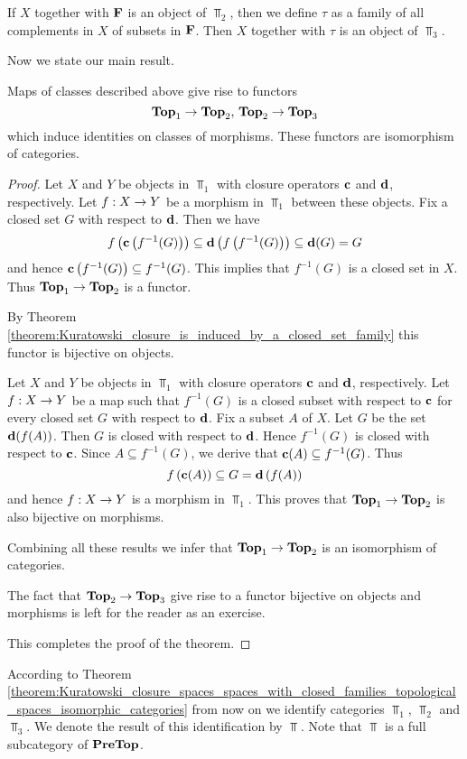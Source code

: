 If $X$ together with $\mathbf{F}$ is an object of $\Top_2$, then we define $\tau$ as a family of all complements in $X$ of subsets in $\mathbf{F}$. Then $X$ together with $\tau$ is an object of $\Top_3$.

Now we state our main result.

\begin{theorem}\label{theorem:Kuratowski_closure_spaces_spaces_with_closed_families_topological_spaces_isomorphic_categories}
	Maps of classes described above give rise to functors
	$$\mathbf{Top}_1 \rightarrow \mathbf{Top}_2,\,\mathbf{Top}_2 \rightarrow \mathbf{Top}_3$$
	which induce identities on classes of morphisms. These functors are isomorphism of categories.
\end{theorem}
\begin{proof}
	Let $X$ and $Y$ be objects in $\Top_1$ with closure operators $\mathbf{c}$ and $\mathbf{d}$, respectively. Let $f:X\rightarrow Y$ be a morphism in $\Top_1$ between these objects. Fix a closed set $G$ with respect to $\mathbf{d}$. Then we have
	$$f\left(\mathbf{c}\left(f^{-1}(G)\right)\right) \subseteq \mathbf{d}\left(f\left(f^{-1}(G)\right)\right) \subseteq \mathbf{d}(G) = G$$
	and hence $\mathbf{c}\left(f^{-1}(G)\right) \subseteq f^{-1}(G)$. This implies that $f^{-1}(G)$ is a closed set in $X$. Thus $\mathbf{Top}_1 \rightarrow \mathbf{Top}_2$ is a functor.

	By Theorem \ref{theorem:Kuratowski_closure_is_induced_by_a_closed_set_family} this functor is bijective on objects.

	Let $X$ and $Y$ be objects in $\Top_1$ with closure operators $\mathbf{c}$ and $\mathbf{d}$, respectively. Let $f:X\rightarrow Y$ be a map such that $f^{-1}(G)$ is a closed subset with respect to $\mathbf{c}$ for every closed set $G$ with respect to $\mathbf{d}$. Fix a subset $A$ of $X$. Let $G$ be the set $\mathbf{d}(f(A))$. Then $G$ is closed with respect to $\mathbf{d}$. Hence $f^{-1}(G)$ is closed with respect to $\mathbf{c}$. Since $A \subseteq f^{-1}(G)$, we derive that $\mathbf{c}(A) \subseteq f^{-1}(G)$. Thus
	$$f\left(\mathbf{c}(A)\right) \subseteq G = \mathbf{d}\left(f(A)\right)$$
	and hence $f:X\rightarrow Y$ is a morphism in $\Top_1$. This proves that $\mathbf{Top}_1 \rightarrow \mathbf{Top}_2$ is also bijective on morphisms.

	Combining all these results we infer that $\mathbf{Top}_1 \rightarrow \mathbf{Top}_2$ is an isomorphism of categories.

	The fact that $\mathbf{Top}_2 \rightarrow \mathbf{Top}_3$ give rise to a functor bijective on objects and morphisms is left for the reader as an exercise.

	This completes the proof of the theorem.
\end{proof}
\noindent
According to Theorem \ref{theorem:Kuratowski_closure_spaces_spaces_with_closed_families_topological_spaces_isomorphic_categories} from now on we identify categories $\Top_1$, $\Top_2$ and $\Top_3$. We denote the result of this identification by $\Top$. Note that $\Top$ is a full subcategory of $\mathbf{PreTop}$.

